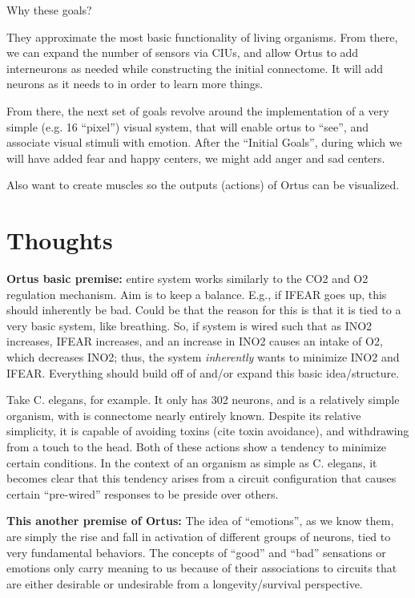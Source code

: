 \documentclass[11pt, a4paper, oneside]{article}   	%
\begin{document}
Why these goals? 

They approximate the most basic functionality of living organisms. From there, we can expand the number of sensors via CIUs, and allow Ortus to add interneurons as needed while constructing the initial connectome. It will add neurons as it needs to in order to learn more things.

From there, the next set of goals revolve around the implementation of a very simple (e.g. 16 ``pixel'') visual system, that will enable ortus to ``see'', and associate visual stimuli with emotion. After the ``Initial Goals'', during which we will have added fear and happy centers, we might add anger and sad centers.


Also want to create muscles so the outputs (actions) of Ortus can be visualized.

\section{Thoughts}



\textbf{Ortus basic premise:} entire system works similarly to the CO2 and O2 regulation mechanism.
Aim is to keep a balance. E.g., if IFEAR goes up, this should inherently be bad. 
Could be that the reason for this is that it is tied to a very basic system, like breathing.
So, if system is wired such that as INO2 increases, IFEAR increases, and an increase in INO2 causes an intake of O2, which decreases INO2; thus, the system \textit{inherently} wants to minimize INO2 and IFEAR. Everything should build off of and/or expand this basic idea/structure.

Take C. elegans, for example. It only has 302 neurons, and is a relatively simple organism, with is connectome nearly entirely known. Despite its relative simplicity, it is capable of avoiding toxins (cite toxin avoidance), and withdrawing from a touch to the head. Both of these actions show a tendency to minimize certain conditions. In the context of an organism as simple as C. elegans, it becomes clear that this tendency arises from a circuit configuration that causes certain ``pre-wired'' responses to be preside over others.

\textbf{This another premise of Ortus:} The idea of ``emotions'', as we know them, are simply the rise and fall in activation of different groups of neurons, tied to very fundamental behaviors. The concepts of ``good'' and ``bad'' sensations or emotions only carry meaning to us because of their associations to circuits that are either desirable or undesirable from a longevity/survival perspective.
\end{document}
